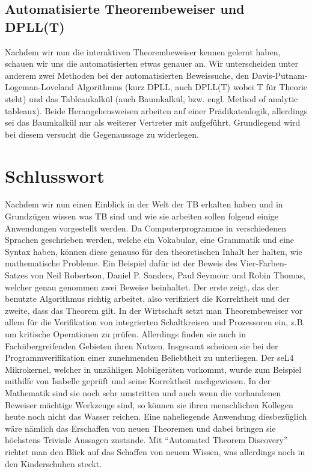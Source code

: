 \subsection{Automatisierte Theorembeweiser und DPLL(T)}
Nachdem wir nun die interaktiven Theorembeweiser kennen gelernt haben, schauen
wir uns die automatisierten etwas genauer an.
Wir unterscheiden unter anderem
zwei Methoden bei der automatisierten Beweissuche, den Davis-Putnam-Logeman-Loveland Algorithmus (kurz DPLL, auch DPLL(T) wobei T für Theorie steht) und das
Tableaukalkül (auch Baumkalkül, bzw. engl. Method of analytic tableaux).
Beide Herangehensweisen arbeiten auf einer Prädikatenlogik, allerdings sei das Baumkalkül
nur als weiterer Vertreter mit aufgeführt.
Grundlegend wird bei diesem versucht die
 Gegenaussage zu widerlegen.


\section{Schlusswort}
Nachdem wir nun einen Einblick in der Welt der TB erhalten haben und in Grundzügen wissen was TB sind und wie sie arbeiten sollen folgend einige Anwendungen vorgestellt werden.
Da Computerprogramme in verschiedenen Sprachen geschrieben werden, welche ein Vokabular, eine Grammatik und eine Syntax haben, können diese genauso für den theoretischen Inhalt her halten, wie mathematische Probleme.
Ein Beispiel dafür ist der Beweis des Vier-Farben-Satzes von Neil Robertson, Daniel P. Sanders, Paul Seymour und Robin Thomas, welcher genau genommen zwei Beweise beinhaltet.
Der erste zeigt, das der benutzte Algorithmus richtig arbeitet, also verifiziert die Korrektheit und der zweite, dass das Theorem gilt.
In der Wirtschaft setzt man Theorembeweiser vor allem für die Verifikation von integrierten Schaltkreisen und Prozessoren ein, z.B. um kritische Operationen zu prüfen.
Allerdings finden sie auch in Fachübergreifenden Gebieten ihren Nutzen. Insgesamt scheinen sie bei der Programmverifikation einer zunehmenden Beliebtheit zu unterliegen.
Der seL4 Mikrokernel, welcher in unzähligen Mobilgeräten vorkommt, wurde zum Beispiel mithilfe von Isabelle geprüft und seine Korrektheit nachgewiesen.
In der Mathematik sind sie noch sehr umstritten und auch wenn die vorhandenen Beweiser mächtige Werkzeuge sind, so können sie ihren menschlichen Kollegen heute noch nicht das Wasser reichen.
Eine naheliegende Anwendung diesbezüglich wäre nämlich das Erschaffen von neuen Theoremen und dabei bringen sie höchstens Triviale Aussagen zustande.
Mit \enquote{Automated Theorem Discovery}~\cite{Gao2014} richtet man den Blick auf das Schaffen von neuem Wissen, was allerdings noch in den Kinderschuhen steckt.
